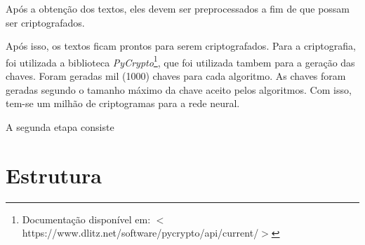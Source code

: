 Após a obtenção dos textos, eles devem ser preprocessados a fim de que possam ser criptografados.

Após isso, os textos ficam prontos para serem criptografados. Para a criptografia, foi utilizada a biblioteca \emph{PyCrypto}\footnote{Documentação disponível em: $<$https://www.dlitz.net/software/pycrypto/api/current/$>$}, que foi utilizada tambem para a geração das chaves.
Foram geradas mil (1000) chaves para cada algoritmo. As chaves foram geradas segundo o tamanho máximo da chave aceito pelos algoritmos.
Com isso, tem-se um milhão de criptogramas para a rede neural.

A segunda etapa consiste

\section{Estrutura}